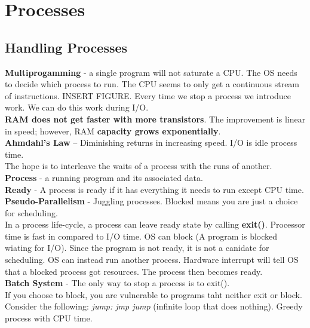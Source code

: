 \documentclass[../base_file/cs1550_notes.tex]{subfiles}
\begin{document}
\chapter{Processes}
\section{Handling Processes}
\textbf{Multiprogamming} - a single program will not saturate a CPU\@.  The OS needs
to decide which process to run.  The CPU seems to only get a continuous stream of
instructions\@. INSERT FIGURE\@.
Every time we stop a process we introduce work.  We can do this work during I/O.\\

\textbf{RAM does not get faster with more transistors}.  The improvement is linear
in speed; however, RAM \textbf{capacity grows exponentially}.\\

\textbf{Ahmdahl's Law} -- Diminishing returns in increasing speed.  I/O is idle process
time.\\

The hope is to interleave the waits of a process with the runs of another.\\

\textbf{Process} - a running program and its associated data.\\

\textbf{Ready} - A process is ready if it has everything it needs to run except CPU time.\\

\textbf{Pseudo-Parallelism} - Juggling processes.  Blocked means you are just a choice for
scheduling.\\

In a process life-cycle, a process can leave ready state by calling \textbf{exit()}.  Processor
time is fast in compared to I/O time.  OS can block (A program is blocked wiating for I/O).  Since
the program is not ready, it is not a canidate for scheduling.  OS can instead run another process.
Hardware interrupt will tell OS that a blocked process got resources.  The process then becomes ready.\\

\textbf{Batch System} - The only way to stop a process is to exit().\\

If you choose to block, you are vulnerable to programs taht neither exit or block.  Consider the following:
\textit{jump: jmp jump} (infinite loop that does nothing).  Greedy process with CPU time.\\
\end{document}
